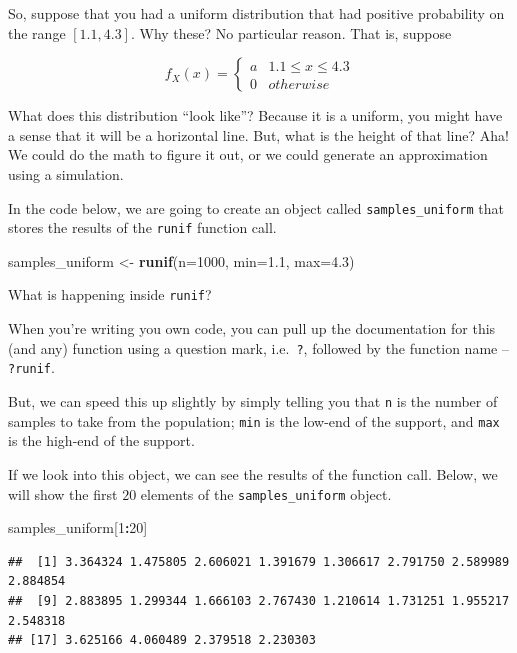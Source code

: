 \documentclass[
]{book}
\newenvironment{Shaded}{\begin{snugshade}}{\end{snugshade}}
\newcommand{\AttributeTok}[1]{\textcolor[rgb]{0.13,0.29,0.53}{#1}}
\newcommand{\DecValTok}[1]{\textcolor[rgb]{0.00,0.00,0.81}{#1}}
\newcommand{\FloatTok}[1]{\textcolor[rgb]{0.00,0.00,0.81}{#1}}
\newcommand{\FunctionTok}[1]{\textcolor[rgb]{0.13,0.29,0.53}{\textbf{#1}}}
\newcommand{\NormalTok}[1]{#1}
\newcommand{\OtherTok}[1]{\textcolor[rgb]{0.56,0.35,0.01}{#1}}
\newcommand{\SpecialCharTok}[1]{\textcolor[rgb]{0.81,0.36,0.00}{\textbf{#1}}}
\theoremstyle{definition}
\theoremstyle{definition}
\theoremstyle{definition}
\theoremstyle{definition}
\theoremstyle{remark}
\begin{document}
So, suppose that you had a uniform distribution that had positive probability on the range \([1.1, 4.3]\). Why these? No particular reason. That is, suppose

\[
  f_{X}(x) = \begin{cases} 
    a & 1.1 \leq x \leq 4.3 \\ 
    0 & otherwise
  \end{cases}
\]

What does this distribution ``look like''? Because it is a uniform, you might have a sense that it will be a horizontal line. But, what is the height of that line? Aha! We could do the math to figure it out, or we could generate an approximation using a simulation.

In the code below, we are going to create an object called \texttt{samples\_uniform} that stores the results of the \texttt{runif} function call.

\begin{Shaded}
\begin{Highlighting}[]
\NormalTok{samples\_uniform }\OtherTok{\textless{}{-}} \FunctionTok{runif}\NormalTok{(}\AttributeTok{n=}\DecValTok{1000}\NormalTok{, }\AttributeTok{min=}\FloatTok{1.1}\NormalTok{, }\AttributeTok{max=}\FloatTok{4.3}\NormalTok{)}
\end{Highlighting}
\end{Shaded}

What is happening inside \texttt{runif}?

When you're writing you own code, you can pull up the documentation for this (and any) function using a question mark, i.e.~\texttt{?}, followed by the function name -- \texttt{?runif}.

But, we can speed this up slightly by simply telling you that \texttt{n} is the number of samples to take from the population; \texttt{min} is the low-end of the support, and \texttt{max} is the high-end of the support.

If we look into this object, we can see the results of the function call. Below, we will show the first \(20\) elements of the \texttt{samples\_uniform} object.

\begin{Shaded}
\begin{Highlighting}[]
\NormalTok{samples\_uniform[}\DecValTok{1}\SpecialCharTok{:}\DecValTok{20}\NormalTok{]}
\end{Highlighting}
\end{Shaded}

\begin{verbatim}
##  [1] 3.364324 1.475805 2.606021 1.391679 1.306617 2.791750 2.589989 2.884854
##  [9] 2.883895 1.299344 1.666103 2.767430 1.210614 1.731251 1.955217 2.548318
## [17] 3.625166 4.060489 2.379518 2.230303
\end{verbatim}
\end{document}
